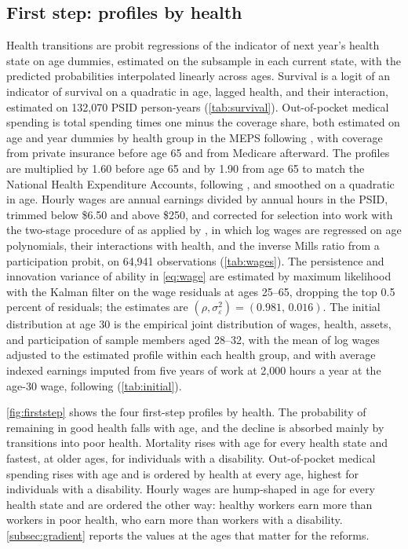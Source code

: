 \subsection{First step: profiles by health}\label{subsec:firststep}

Health transitions are probit regressions of the indicator of next year's health state on age dummies, estimated on the subsample in each current state, with the predicted probabilities interpolated linearly across ages. %
Survival is a logit of an indicator of survival on a quadratic in age, lagged health, and their interaction, estimated on 132,070 PSID person-years (\autoref{tab:survival}). %
Out-of-pocket medical spending is total spending times one minus the coverage share, both estimated on age and year dummies by health group in the MEPS following \citet{Pashchenko2019}, with coverage from private insurance before age 65 and from Medicare afterward. The profiles are multiplied by 1.60 before age 65 and by 1.90 from age 65 to match the National Health Expenditure Accounts, following \citet{Denardi2018}, and smoothed on a quadratic in age. %
Hourly wages are annual earnings divided by annual hours in the PSID, trimmed below \$6.50 and above \$250, and corrected for selection into work with the two-stage procedure of \citet{Heckman1976} as applied by \citet{Guner2012}, in which log wages are regressed on age polynomials, their interactions with health, and the inverse Mills ratio from a participation probit, on 64,941 observations (\autoref{tab:wages}). %
The persistence and innovation variance of ability in \eqref{eq:wage} are estimated by maximum likelihood with the Kalman filter on the wage residuals at ages 25--65, dropping the top 0.5 percent of residuals; the estimates are $(\rho,\sigma_\varepsilon^2)=(0.981,\,0.016)$. %
The initial distribution at age 30 is the empirical joint distribution of wages, health, assets, and participation of sample members aged 28--32, with the mean of log wages adjusted to the estimated profile within each health group, and with average indexed earnings imputed from five years of work at 2,000 hours a year at the age-30 wage, following \citet{french2005effects} (\autoref{tab:initial}). %

\autoref{fig:firststep} shows the four first-step profiles by health. The probability of remaining in good health falls with age, and the decline is absorbed mainly by transitions into poor health. %
Mortality rises with age for every health state and fastest, at older ages, for individuals with a disability. %
Out-of-pocket medical spending rises with age and is ordered by health at every age, highest for individuals with a disability. %
Hourly wages are hump-shaped in age for every health state and are ordered the other way: healthy workers earn more than workers in poor health, who earn more than workers with a disability. %
\autoref{subsec:gradient} reports the values at the ages that matter for the reforms.

